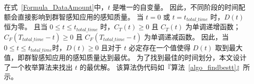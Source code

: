在式~\eqref{Formula_DataAmount}中，$t$ 是唯一的自变量。
因此，不同阶段的时间配额会直接影响到群智感知应用的感知质量。
当 $t=0$ 或 $t=t_{total\_time}$ 时，$D(t)$ 恒为零。
且当 $0 \leq t \leq t_{total\_time}$ 时，$C_T(t)\geq 0$ 且 $C_T(t)$ 为单调递增函数；$C_F(T_{total\_time}-t) \geq 0$ 且 $C_F(T_{total\_time}-t)$ 为单调递减函数。
因此，当$0 \leq t \leq t_{total\_time}$时，$D(t) \geq 0$ 且对于 $t$ 必定存在一个值使得 $D(t)$ 取到最大值，即群智感知应用的感知质量达到最优。
为了找到最佳的时间划分，本文设计了一个枚举算法来找出 $t$ 的最优解。
该算法伪代码如『算法~\ref{algo_findbestt}』所示。



